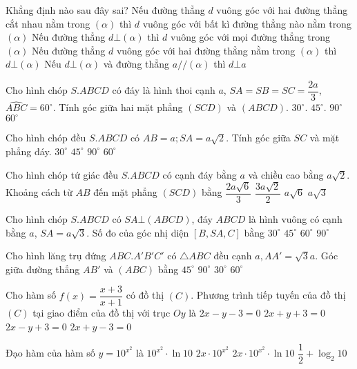 \begin{ex}
Khẳng định nào sau đây sai?
\choice
{Nếu đường thẳng $d$ vuông góc với hai đường thẳng cắt nhau nằm trong $\left(\alpha\right)$ thì $d$ vuông góc với bất kì đường thẳng nào nằm trong $\left(\alpha\right)$}
{Nếu đường thẳng $d\bot \left(\alpha\right)$ thì $d$ vuông góc với mọi đường thẳng trong $\left(\alpha\right)$}
{Nếu đường thẳng $d$ vuông góc với hai đường thẳng nằm trong $\left(\alpha\right)$ thì $d\bot \left(\alpha\right)$}
{Nếu $d\bot \left(\alpha\right)$ và đường thẳng $a//\left(\alpha\right)$ thì $d\bot a$}
\end{ex}
\begin{ex}
Cho hình chóp $S.ABCD$ có đáy là hình thoi cạnh $a$, $SA=SB=SC=\dfrac{2a}{3}$, $\widehat{ABC}=60^\circ$. Tính góc giữa hai mặt phẳng $(SCD)$ và $(ABCD)$.
\choice
{${{30}^\circ}$.}
{${{45}^\circ}$.}
{${{90}^\circ}$}
{${{60}^\circ}$}
\end{ex}
\begin{ex}
Cho hình chóp đều $S.ABCD$ có $AB=a;SA=a\sqrt{2}$. Tính góc giữa $SC$ và mặt phẳng đáy.
\choice
{${{30}^\circ}$}
{${{45}^\circ}$}
{${{90}^\circ}$}
{${{60}^\circ}$}
\end{ex}
\begin{ex}
Cho hình chóp tứ giác đều $S.ABCD$ có cạnh đáy bằng $a$ và chiều cao bằng $a\sqrt{2}$. Khoảng cách từ $AB$ đến mặt phẳng $(SCD)$ bằng
\choice
{$\dfrac{2a\sqrt{6}}{3}$}
{$\dfrac{3a\sqrt{2}}{2}$}
{$a\sqrt{6}$}
{$a\sqrt{3}$}
\end{ex}
\begin{ex}
Cho hình chóp $S.ABCD$ có $SA\bot (ABCD)$, đáy $ABCD$ là hình vuông có cạnh bằng $a$, $SA=a\sqrt{3}$. Số đo của góc nhị diện $\left[B, SA, C\right]$ bằng
\choice
{${{30}^\circ}$}
{${{45}^\circ}$}
{${{60}^\circ}$}
{${{90}^\circ}$}
\end{ex}
\begin{ex}
Cho hình lăng trụ đứng $ABC. A'B'C'$ có $\triangle ABC$ đều cạnh $a,AA'=\sqrt{3}a$. Góc giữa đường thẳng $AB'$ và $(ABC)$ bằng
\choice
{${{45}^\circ}$}
{${{90}^\circ}$}
{${{30}^\circ}$}
{${{60}^\circ}$}
\end{ex}
\begin{ex}
Cho hàm số $f(x)=\dfrac{x+3}{x+1}$ có đồ thị $(C)$. Phương trình tiếp tuyến của đồ thị $(C)$ tại giao điểm của đồ thị với trục $Oy$ là
\choice
{$2x-y-3=0$}
{$2x+y+3=0$}
{$2x-y+3=0$}
{$2x+y-3=0$}
\end{ex}
\begin{ex}
Đạo hàm của hàm số $y={{10}^{x^2}}$ là
\choice
{${{10}^{x^2}} \cdot \ln 10$}
{$2x \cdot 10^{x^2}$}
{$2x \cdot 10^{x^2} \cdot \ln 10$}
{$\dfrac{1}{2}+\log_2 10$}
\end{ex}
